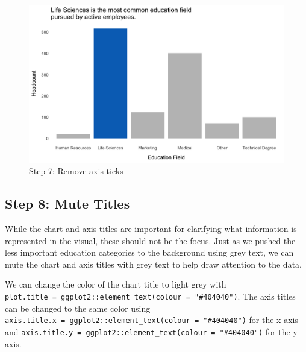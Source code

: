 \documentclass[
]{book}
\begin{document}
\begin{figure}

{\centering \includegraphics[width=1\linewidth]{graphics/viz_step_7} 

}

\caption{Step 7: Remove axis ticks}\label{fig:barchart-7}
\end{figure}

\hypertarget{step-8-mute-titles}{%
\subsection{Step 8: Mute Titles}\label{step-8-mute-titles}}

While the chart and axis titles are important for clarifying what information is represented in the visual, these should not be the focus. Just as we pushed the less important education categories to the background using grey text, we can mute the chart and axis titles with grey text to help draw attention to the data.

We can change the color of the chart title to light grey with \texttt{plot.title\ =\ ggplot2::element\_text(colour\ =\ "\#404040")}. The axis titles can be changed to the same color using \texttt{axis.title.x\ =\ ggplot2::element\_text(colour\ =\ "\#404040")} for the x-axis and \texttt{axis.title.y\ =\ ggplot2::element\_text(colour\ =\ "\#404040")} for the y-axis.
\end{document}
